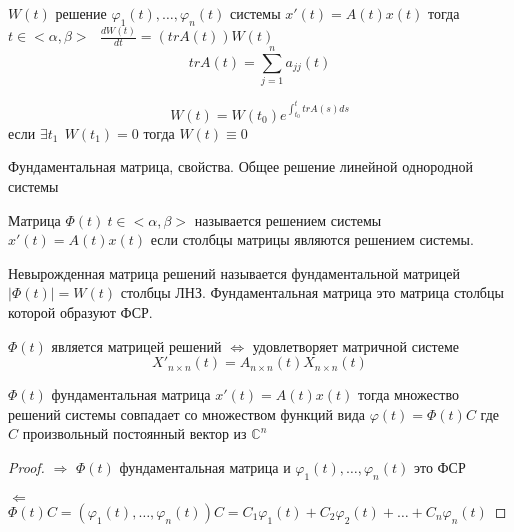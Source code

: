 \begin{theorem}
  $W(t)$ решение $\varphi_1(t), \ldots, \varphi_n(t)$ системы $x'(t) = A(t)x(t)$
  тогда $t \in <\alpha, \beta> ~~~ \frac{dW(t)}{dt} = (trA(t))W(t)$
  $$
  trA(t) = \sum_{j=1}^n a_{jj}(t)
  $$
\end{theorem}

\begin{block}
  $$
  W(t) = W(t_0)e^{\int_{t_0}^t tr A(s)ds}
  $$
  если $\exists t_1 ~~ W(t_1) = 0$ тогда $W(t) \equiv 0$
\end{block}

\begin{title}[\Large]
  Фундаментальная матрица, свойства. Общее решение линейной однородной системы
\end{title}

\begin{define}
  Матрица $\Phi(t) ~ t \in <\alpha, \beta>$ называется решением системы
  $x'(t) = A(t)x(t)$ если столбцы матрицы являются решением системы.
\end{define}

\begin{define}
  Невырожденная матрица решений называется фундаментальной матрицей
  $|\Phi(t)| = W(t)$ столбцы ЛНЗ. Фундаментальная матрица это матрица столбцы
  которой образуют ФСР.
\end{define}

\begin{block}[Утверждение]
  $\Phi(t)$ является матрицей решений $\Leftrightarrow$ удовлетворяет
  матричной системе
  $$
  X'_{n \times n}(t) = A_{n \times n}(t) X_{n \times n}(t)
  $$
\end{block}

\begin{theorem}
  $\Phi(t)$ фундаментальная матрица $x'(t) = A(t)x(t)$
  тогда множество решений системы совпадает со множеством функций вида
  $\varphi(t) = \Phi(t)C$ где $C$ произвольный постоянный вектор из
  $\mathbb{C}^n$
\end{theorem}

\begin{proof}
  $\Rightarrow$ $\Phi(t)$ фундаментальная матрица и $\varphi_1(t), \ldots,
  \varphi_n(t)$ это ФСР

  $\Leftarrow$ $\Phi(t)C = (\varphi_1(t), \ldots, \varphi_n(t))C = C_1
  \varphi_1(t) + C_2 \varphi_2(t) + \ldots + C_n \varphi_n(t)$
\end{proof}


